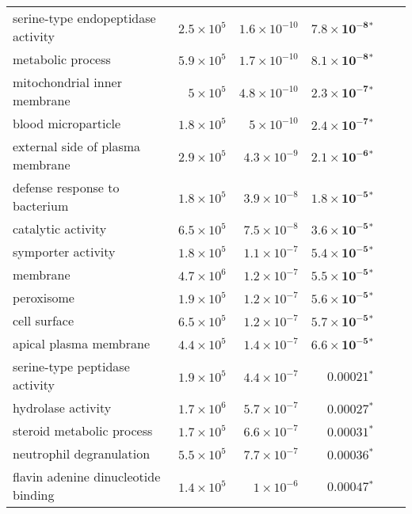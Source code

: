 \documentclass{article}
\begin{document}
\begin{longtable}{|l|r|r|r|r|r|}
       serine-type endopeptidase activity & $2.5\times 10^{5}$ & $1.6\times 10^{-10}$ &   $\bm{7.8\times 10^{-8}{^*}}$ \\
                        metabolic process & $5.9\times 10^{5}$ & $1.7\times 10^{-10}$ &   $\bm{8.1\times 10^{-8}{^*}}$ \\
             mitochondrial inner membrane &  $ 5\times 10^{5}$ & $4.8\times 10^{-10}$ &   $\bm{2.3\times 10^{-7}{^*}}$ \\
                      blood microparticle & $1.8\times 10^{5}$ &  $ 5\times 10^{-10}$ &   $\bm{2.4\times 10^{-7}{^*}}$ \\
         external side of plasma membrane & $2.9\times 10^{5}$ &  $4.3\times 10^{-9}$ &   $\bm{2.1\times 10^{-6}{^*}}$ \\
            defense response to bacterium & $1.8\times 10^{5}$ &  $3.9\times 10^{-8}$ &   $\bm{1.8\times 10^{-5}{^*}}$ \\
                       catalytic activity & $6.5\times 10^{5}$ &  $7.5\times 10^{-8}$ &   $\bm{3.6\times 10^{-5}{^*}}$ \\
                       symporter activity & $1.8\times 10^{5}$ &  $1.1\times 10^{-7}$ &   $\bm{5.4\times 10^{-5}{^*}}$ \\
                                 membrane & $4.7\times 10^{6}$ &  $1.2\times 10^{-7}$ &   $\bm{5.5\times 10^{-5}{^*}}$ \\
                               peroxisome & $1.9\times 10^{5}$ &  $1.2\times 10^{-7}$ &   $\bm{5.6\times 10^{-5}{^*}}$ \\
                             cell surface & $6.5\times 10^{5}$ &  $1.2\times 10^{-7}$ &   $\bm{5.7\times 10^{-5}{^*}}$ \\
                   apical plasma membrane & $4.4\times 10^{5}$ &  $1.4\times 10^{-7}$ &   $\bm{6.6\times 10^{-5}{^*}}$ \\
           serine-type peptidase activity & $1.9\times 10^{5}$ &  $4.4\times 10^{-7}$ &             $\bm{0.00021{^*}}$ \\
                       hydrolase activity & $1.7\times 10^{6}$ &  $5.7\times 10^{-7}$ &             $\bm{0.00027{^*}}$ \\
                steroid metabolic process & $1.7\times 10^{5}$ &  $6.6\times 10^{-7}$ &             $\bm{0.00031{^*}}$ \\
                 neutrophil degranulation & $5.5\times 10^{5}$ &  $7.7\times 10^{-7}$ &             $\bm{0.00036{^*}}$ \\
      flavin adenine dinucleotide binding & $1.4\times 10^{5}$ &   $ 1\times 10^{-6}$ &             $\bm{0.00047{^*}}$ \\

\end{longtable}
\end{document}

